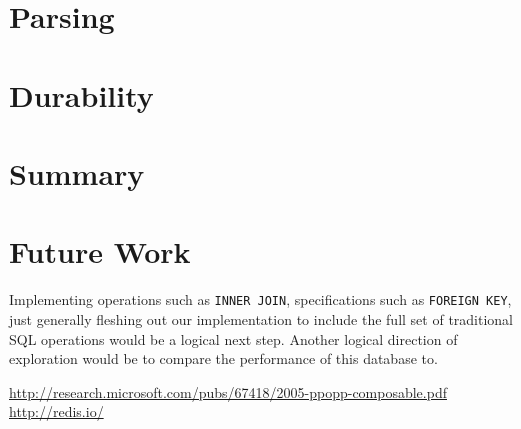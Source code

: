 \documentclass[10pt]{article}
\begin{document}
\begin{multicols}{2}
\section{Parsing}

\section{Durability}

\section{Summary}

\section{Future Work}

Implementing operations such as \texttt{INNER JOIN}, specifications such as \texttt{FOREIGN KEY}, just generally fleshing out our implementation to include the full set of traditional SQL operations would be a logical next step. Another logical direction of exploration would be to compare the performance of this database to. 

\end{multicols}

\begin{thebibliography}{1}

 \url{http://research.microsoft.com/pubs/67418/2005-ppopp-composable.pdf}
 \url{http://redis.io/}

\end{thebibliography}
\end{document}
